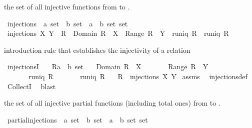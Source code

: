 \begin{isabellebody}
\begin{isamarkuptext}
the set of all injective functions from  to .%
\end{isamarkuptext}%
\isamarkuptrue%
\isamarkupfalse%
\ injections\ {\isacharcolon}{\isacharcolon}\ {\isachardoublequoteopen}{\isacharprime}a\ set\ {\isasymRightarrow}\ {\isacharprime}b\ set\ {\isasymRightarrow}\ {\isacharparenleft}{\isacharprime}a\ {\isasymtimes}\ {\isacharprime}b{\isacharparenright}\ set\ set{\isachardoublequoteclose}\isanewline
{}\ {\isachardoublequoteopen}injections\ X\ Y\ {\isacharequal}\ {\isacharbraceleft}R\ {\isachardot}\ Domain\ R\ {\isacharequal}\ X\ {\isasymand}\ Range\ R\ {\isasymsubseteq}\ Y\ {\isasymand}\ runiq\ R\ {\isasymand}\ runiq\ {\isacharparenleft}R{\isasyminverse}{\isacharparenright}{\isacharbraceright}{\isachardoublequoteclose}%
\begin{isamarkuptext}%
introduction rule that establishes the injectivity of a relation%
\end{isamarkuptext}%
\isamarkuptrue%
\isamarkupfalse%
\ injectionsI{\isacharcolon}\isanewline
\ \ \ R{\isacharcolon}{\isacharcolon}{\isachardoublequoteopen}{\isacharparenleft}{\isacharprime}a\ {\isasymtimes}\ {\isacharprime}b{\isacharparenright}\ set{\isachardoublequoteclose}\isanewline
\ \ \ {\isachardoublequoteopen}Domain\ R\ {\isacharequal}\ X{\isachardoublequoteclose}\isanewline
\ \ \ \ \ \ \ {\isachardoublequoteopen}Range\ R\ {\isasymsubseteq}\ Y{\isachardoublequoteclose}\isanewline
\ \ \ \ \ \ \ {\isachardoublequoteopen}runiq\ R{\isachardoublequoteclose}\isanewline
\ \ \ \ \ \ \ {\isachardoublequoteopen}runiq\ {\isacharparenleft}R{\isasyminverse}{\isacharparenright}{\isachardoublequoteclose}\isanewline
\ \ \ {\isachardoublequoteopen}R\ {\isasymin}\ injections\ X\ Y{\isachardoublequoteclose}\isanewline
%
\isadelimproof
%
\endisadelimproof
%
\isatagproof
{}\isamarkupfalse%
\ assms\ \isamarkupfalse%
\ injections{\isacharunderscore}def\ \isamarkupfalse%
\ CollectI\ \isamarkupfalse%
\ blast%
\endisatagproof
{\isafoldproof}%
%
\isadelimproof
%
\endisadelimproof
%
\begin{isamarkuptext}%
the set of all injective partial functions (including total ones) from  to .%
\end{isamarkuptext}%
\isamarkuptrue%
\isamarkupfalse%
\ partial{\isacharunderscore}injections\ {\isacharcolon}{\isacharcolon}\ {\isachardoublequoteopen}{\isacharprime}a\ set\ {\isasymRightarrow}\ {\isacharprime}b\ set\ {\isasymRightarrow}\ {\isacharparenleft}{\isacharprime}a\ {\isasymtimes}\ {\isacharprime}b{\isacharparenright}\ set\ set{\isachardoublequoteclose}\isanewline

\end{isabellebody}
